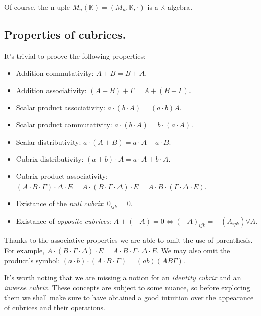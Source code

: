 Of course, the n-uple $M_n (\mathbb{K}) = (M_n, \mathbb{K}, \cdot)$ is a $\mathbb{K}$-algebra.

\subsection{Properties of cubrices.} \label{defs-properties}

It's trivial to proove the following properties:

\begin{itemize}
	\item Addition commutativity: $A + B = B + A$.
	\item Addition associativity: $(A + B) + \Gamma = A + (B + \Gamma)$.
	\item Scalar product associativity: $a\cdot (b\cdot A) = (a\cdot b)A$.
	\item Scalar product commutativity: $a\cdot (b\cdot A) = b\cdot (a\cdot A)$.
	\item Scalar distributivity: $a\cdot (A + B) = a\cdot A + a\cdot B$.
	\item Cubrix distributivity: $(a + b)\cdot A = a\cdot A + b\cdot A$.
	\item Cubrix product associativity: $(A \cdot B \cdot \Gamma) \cdot \Delta \cdot E = A \cdot (B \cdot \Gamma \cdot \Delta) \cdot E = A \cdot B \cdot (\Gamma \cdot \Delta \cdot E)$.
	\item Existance of the \textit{null cubrix}: $0_{ijk} = 0$.
	\item Existance of \textit{opposite cubrices}: $A + (-A) = 0 \Leftrightarrow (-A)_{ijk} = -(A_{ijk}) \forall A$.
\end{itemize}

Thanks to the associative properties we are able to omit the use of parenthesis. For example, $A \cdot (B \cdot \Gamma \cdot \Delta) \cdot E = A \cdot B \cdot \Gamma \cdot \Delta \cdot E$. We may also omit the product's symbol: $(a\cdot b)\cdot (A \cdot B \cdot \Gamma) = (ab)(AB\Gamma)$.

It's worth noting that we are missing a notion for an \textit{identity cubrix} and an \textit{inverse cubrix}. These concepts are subject to some nuance, so before exploring them we shall make sure to have obtained a good intuition over the appearance of cubrices and their operations.
